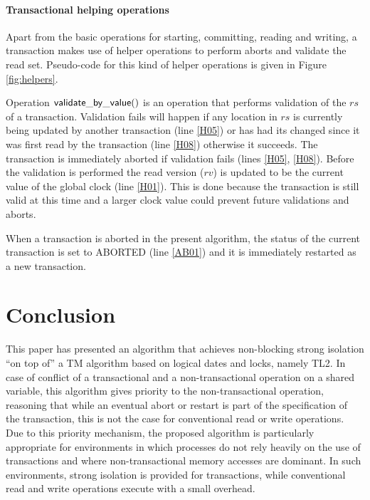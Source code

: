 \documentclass[11pt,letterpaper]{article}
\begin{document}
\paragraph{Transactional helping operations} 
Apart from the basic operations for starting, committing, 
reading and writing, a transaction makes use of helper 
operations to perform aborts and validate the read set.
 Pseudo-code for this kind of helper operations 
is given in Figure \ref{fig:helpers}.

Operation ${\sf validate\_by\_value()}$ is an operation that performs 
validation of the $\mathit{rs}$ of a transaction. 
Validation fails 
will happen if any location in $\mathit{rs}$ is 
currently being updated by another transaction (line \ref{H05})
or has had its changed since it was first read by the transaction (line \ref{H08})
otherwise it succeeds.
The transaction is immediately aborted if validation fails (lines \ref{H05}, \ref{H08}).
Before the validation is performed the read version ($\mathit{rv}$) is updated
to be the current value of the global clock (line \ref{H01}).
This is done because the transaction is still valid at this time and a larger
clock value could prevent future validations and aborts.

When a transaction is aborted in the present algorithm, 
the status of the current transaction is set to ABORTED (line \ref{AB01}) and
it is immediately restarted as a new transaction.



\section{Conclusion}
\label{sec:conclusions}
This paper has presented an algorithm that achieves non-blocking strong 
isolation  ``on top of'' a TM algorithm based on logical dates and locks, 
namely  TL2. 
In case of conflict of a transactional and a non-transactional
operation on a shared variable, this algorithm gives priority to 
the non-transactional operation, 
reasoning that while an eventual abort or restart is part of the 
specification of the transaction,
this is not the case for conventional read or write operations. 
Due to this priority mechanism, 
the proposed algorithm is   particularly appropriate  for environments 
in which processes do not rely heavily
on the use of transactions and where non-transactional memory 
accesses are dominant. In 
such environments, strong isolation is  provided for transactions, 
while conventional read and write operations execute with a small overhead.
\end{document}
